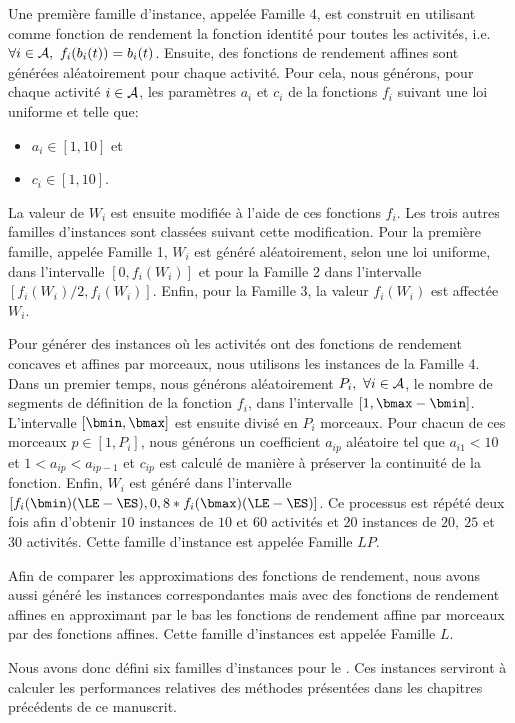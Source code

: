Une première famille d'instance, appelée Famille 4, est construit en
utilisant comme fonction de rendement la fonction identité pour toutes
les activités, i.e. $\forall i \in \A,\ f_i(b_i(t))= b_i(t)$. Ensuite,
des fonctions de rendement affines sont générées aléatoirement pour
chaque activité. Pour cela, nous générons, pour chaque activité $i \in
{\cal A}$, les paramètres $a_i$ et $c_i$ de la fonctions $f_i$ suivant une
loi uniforme et telle que:
\begin{itemize}
\item $a_i \in [1,10]$ et
\item $c_i \in [1,10]$.
\end{itemize} La valeur de $W_i$ est ensuite modifiée à l'aide de ces
fonctions $f_i$. Les trois autres familles d'instances sont classées
suivant cette modification. Pour la première famille, appelée Famille
1, $W_i$ est généré aléatoirement, selon une loi uniforme, dans
l'intervalle $[0,f_i(W_i)]$ et pour la Famille 2 dans l'intervalle
$[f_i(W_i)/2, f_i(W_i)]$. Enfin, pour la Famille 3, la valeur
$f_i(W_i)$ est affectée $W_i$. 

Pour générer des instances où les activités ont des fonctions de
rendement concaves et affines par morceaux, nous utilisons les
instances de la Famille 4. Dans un premier temps, nous générons
aléatoirement $P_i,\ \forall i \in {\cal A}$, le nombre de segments de
définition de la fonction $f_i$, dans l'intervalle $[1 ,\bmax -
\bmin]$. L'intervalle $[\bmin,\bmax]$ est ensuite divisé en $P_i$
morceaux. Pour chacun de ces morceaux $ p \in [1,P_i]$, nous générons
un coefficient $a_{ip}$ aléatoire tel que $a_{i1}<10$ et $1 < a_{ip} <
a_{ip-1}$ et $c_{ip}$ est calculé de manière à préserver la continuité
de la fonction. Enfin, $W_i$ est généré dans l'intervalle
$[f_i(\bmin)(\LE-\ES), 0,8*f_i(\bmax)(\LE-\ES)]$. Ce processus est
répété deux fois afin d'obtenir $10$ instances de $10$ et $60$
activités et $20$ instances de $20,\ 25$ et $30$ activités. Cette
famille d'instance est appelée Famille $LP$. 
 
Afin de comparer les approximations des fonctions de rendement, nous
avons aussi généré les instances correspondantes mais avec des
fonctions de rendement affines en approximant par le bas les fonctions de
rendement affine par morceaux par des fonctions affines. Cette famille
d'instances est appelée Famille $L$. 

Nous avons donc défini six familles d'instances pour le \CECSP. Ces
instances serviront à calculer les performances relatives des méthodes
présentées dans les chapitres précédents de ce manuscrit. 

